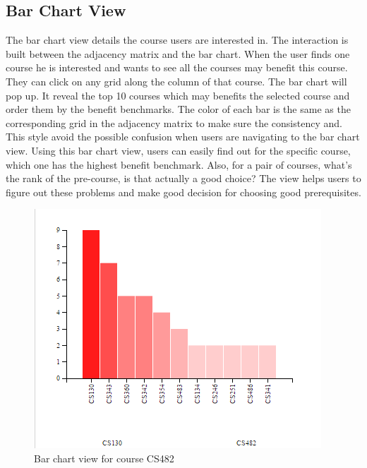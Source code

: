 \subsection{Bar Chart View}
\label{sec:bar}
The bar chart view details the course users are interested in. The interaction is built between the adjacency matrix and the bar chart. When the user finds one course he is interested and wants to see all the courses may benefit this course. They can click on any grid along the column of that course. The bar chart will pop up. It reveal the top 10 courses which may benefits the selected course and order them by the benefit benchmarks. The color of each bar is the same as the corresponding grid in the adjacency matrix to make sure the consistency and.  This style avoid the possible confusion when users are navigating to the bar chart view. Using this bar chart view, users can easily find out for the specific course, which one has the highest benefit benchmark. Also, for a pair of courses, what’s the rank of the pre-course, is that actually a good choice? The view helps users to figure out these problems and make good decision for choosing good prerequisites. 
\begin{figure}[h]
	\centering %
	\includegraphics[width=\columnwidth]{figs/barchart} 
	\caption{Bar chart view for course CS482}
	\label{fig:sample}
\end{figure}

